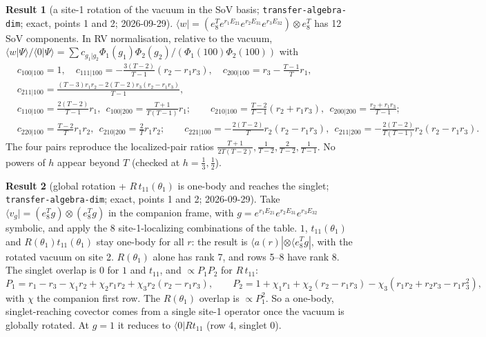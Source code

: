 \documentclass[11pt]{article}
\newcommand{\nb}[1]{\texttt{#1}}
\newcommand{\vac}{\langle 0|}
\theoremstyle{definition}
\newtheorem{result}{Result}
\theoremstyle{remark}
\begin{document}
\begin{result}[{a site-1 rotation of the vacuum in the SoV basis; \nb{transfer-algebra-dim}; exact, points 1 and 2; 2026-09-29}]
$\langle w|=(e_8^Te^{r_1E_{21}}e^{r_2E_{31}}e^{r_3E_{32}})\otimes e_8^T$ has 12 SoV components. In RV normalisation, relative to the vacuum, $\langle w|\Psi\rangle/\langle0|\Psi\rangle=\sum c_{g_1|g_2}\Phi_1(g_1)\Phi_2(g_2)/(\Phi_1(100)\Phi_2(100))$ with
\begin{align*}
&c_{100|100}=1,\quad c_{111|100}=-\tfrac{3(T-2)}{T-1}(r_2-r_1r_3),\quad c_{200|100}=r_3-\tfrac{T-1}{T}r_1,\\
&c_{211|100}=\tfrac{(T-3)r_1r_2-2(T-2)r_3(r_2-r_1r_3)}{T-1},\\
&c_{110|100}=\tfrac{2(T-2)}{T-1}r_1,\ \ c_{100|200}=\tfrac{T+1}{T(T-1)}r_1;\qquad c_{210|100}=\tfrac{T-2}{T-1}(r_2+r_1r_3),\ \ c_{200|200}=\tfrac{r_2+r_1r_3}{T-1};\\
&c_{220|100}=\tfrac{T-2}{T}r_1r_2,\ \ c_{210|200}=\tfrac2Tr_1r_2;\qquad c_{221|100}=-\tfrac{2(T-2)}{T}r_2(r_2-r_1r_3),\ \ c_{211|200}=-\tfrac{2(T-2)}{T(T-1)}r_2(r_2-r_1r_3).
\end{align*}
The four pairs reproduce the localized-pair ratios $\frac{T+1}{2T(T-2)},\frac1{T-2},\frac2{T-2},\frac1{T-1}$. No powers of $h$ appear beyond $T$ (checked at $h=\frac13,\frac12$).
\end{result}

\begin{result}[{global rotation + $R\,t_{11}(\theta_1)$ is one-body and reaches the singlet; \nb{transfer-algebra-dim}; exact, points 1 and 2; 2026-09-29}]
Take $\langle v_g|=(e_8^Tg)\otimes(e_8^Tg)$ in the companion frame, with $g=e^{r_1E_{21}}e^{r_2E_{31}}e^{r_3E_{32}}$ symbolic, and apply the 8 site-1-localizing combinations of the table.
$1$, $t_{11}(\theta_1)$ and $R(\theta_1)t_{11}(\theta_1)$ stay one-body for all $r$: the result is $\langle a(r)|\otimes\langle e_8^Tg|$, with the rotated vacuum on site 2. $R(\theta_1)$ alone has rank 7, and rows 5--8 have rank 8.
The singlet overlap is $0$ for $1$ and $t_{11}$, and $\propto P_1P_2$ for $R\,t_{11}$:
\[
P_1=r_1-r_3-\chi_1r_2+\chi_2r_1r_2+\chi_3r_2(r_2-r_1r_3),\qquad
P_2=1+\chi_1r_1+\chi_2(r_2-r_1r_3)-\chi_3(r_1r_2+r_2r_3-r_1r_3^2),
\]
with $\chi$ the companion first row. The $R(\theta_1)$ overlap is $\propto P_1^2$.
So a one-body, singlet-reaching covector comes from a single site-1 operator once the vacuum is globally rotated. At $g=1$ it reduces to $\vac Rt_{11}$ (row 4, singlet $0$).
\end{result}
\end{document}
